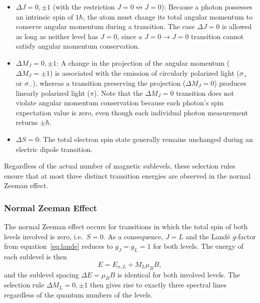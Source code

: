 \documentclass{article}
\begin{document}
\begin{itemize}
    \item $\Delta J = 0, \pm 1$ (with the restriction $J = 0 \not\leftrightarrow J = 0$): Because a photon possesses an intrinsic spin of $1\hbar$, the atom must change its total angular momentum to conserve angular momentum during a transition. The case $\Delta J = 0$ is allowed as long as neither level has $J = 0$, since a $J=0 \to J=0$ transition cannot satisfy angular momentum conservation.
    \item $\Delta M_J = 0, \pm 1$: A change in the projection of the angular momentum ($\Delta M_J = \pm 1$) is associated with the emission of circularly polarized light ($\sigma_+$ or $\sigma_-$), whereas a transition preserving the projection ($\Delta M_J = 0$) produces linearly polarized light ($\pi$). Note that the $\Delta M_J = 0$ transition does not violate angular momentum conservation because each photon's spin expectation value is zero, even though each individual photon measurement returns $\pm\hbar$.
    \item $\Delta S = 0$: The total electron spin state generally remains unchanged during an electric dipole transition.
\end{itemize}

Regardless of the actual number of magnetic sublevels, these selection rules ensure that at most three distinct transition energies are observed in the normal Zeeman effect.

\subsubsection{Normal Zeeman Effect}

The normal Zeeman effect occurs for transitions in which the total spin of both levels involved is zero, i.e.\ $S = 0$. As a consequence, $J = L$ and the Landé $g$-factor from equation~\eqref{eq:lande} reduces to $g_J = g_L = 1$ for both levels. The energy of each sublevel is then
\begin{equation}
    E = E_{n,L} + M_L\mu_BB,
\end{equation}
and the sublevel spacing $\Delta E = \mu_B B$ is identical for both involved levels. The selection rule $\Delta M_L = 0, \pm 1$ then gives rise to exactly three spectral lines regardless of the quantum numbers of the levels.
\end{document}
